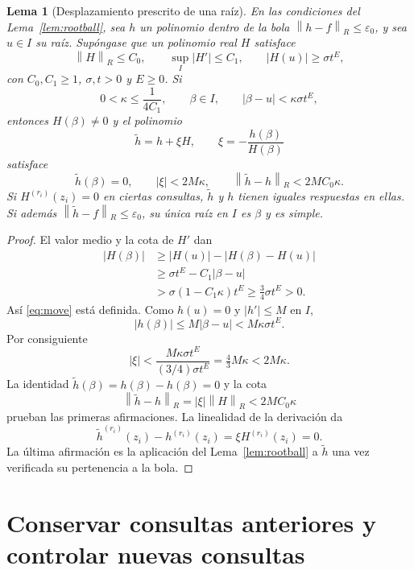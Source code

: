\documentclass[11pt,a4paper]{article}
\numberwithin{equation}{section}
\newtheorem{lemma}[theorem]{Lema}
\theoremstyle{definition}
\theoremstyle{remark}
\newcommand{\norm}[1]{\left\lVert#1\right\rVert}
\begin{document}
\begin{lemma}[Desplazamiento prescrito de una raíz]\label{lem:move}
En las condiciones del Lema~\ref{lem:rootball}, sea $h$ un polinomio dentro de la bola $\norm{h-f}_R\le\varepsilon_0$, y sea $u\in I$ su raíz. Supóngase que un polinomio real $H$ satisface
\[
\norm H_R\le C_0,\qquad \sup_I|H'|\le C_1,\qquad
|H(u)|\ge\sigma t^E,
\]
con $C_0,C_1\ge1$, $\sigma,t>0$ y $E\ge0$. Si
\[
0<\kappa\le\frac1{4C_1},\qquad
\beta\in I,\qquad |\beta-u|<\kappa\sigma t^E,
\]
entonces $H(\beta)\ne0$ y el polinomio
\begin{equation}\label{eq:move}
\widetilde h=h+\xi H,\qquad \xi=-\frac{h(\beta)}{H(\beta)}
\end{equation}
satisface
\[
\widetilde h(\beta)=0,\qquad
|\xi|<2M\kappa,\qquad
\norm{\widetilde h-h}_R<2MC_0\kappa.
\]
Si $H^{(r_i)}(z_i)=0$ en ciertas consultas, $\widetilde h$ y $h$ tienen iguales respuestas en ellas. Si además $\norm{\widetilde h-f}_R\le\varepsilon_0$, su única raíz en $I$ es $\beta$ y es simple.
\end{lemma}
\begin{proof}
El valor medio y la cota de $H'$ dan
\begin{align*}
|H(\beta)|&\ge |H(u)|-|H(\beta)-H(u)|\\
&\ge\sigma t^E-C_1|\beta-u|\\
&>\sigma(1-C_1\kappa)t^E\ge\tfrac34\sigma t^E>0.
\end{align*}
Así \eqref{eq:move} está definida. Como $h(u)=0$ y $|h'|\le M$ en $I$,
\[
|h(\beta)|\le M|\beta-u|<M\kappa\sigma t^E.
\]
Por consiguiente
\[
|\xi|<\frac{M\kappa\sigma t^E}{(3/4)\sigma t^E}
=\tfrac43M\kappa<2M\kappa.
\]
La identidad $\widetilde h(\beta)=h(\beta)-h(\beta)=0$ y la cota
\[
\norm{\widetilde h-h}_R=|\xi|\norm H_R<2MC_0\kappa
\]
prueban las primeras afirmaciones. La linealidad de la derivación da
\[
\widetilde h^{(r_i)}(z_i)-h^{(r_i)}(z_i)=\xi H^{(r_i)}(z_i)=0.
\]
La última afirmación es la aplicación del Lema~\ref{lem:rootball} a $\widetilde h$ una vez verificada su pertenencia a la bola.
\end{proof}

\clearpage
\section{Conservar consultas anteriores y controlar nuevas consultas}\label{sec:linear}
\end{document}

